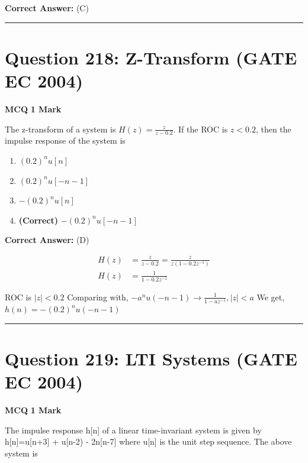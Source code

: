 \documentclass[11pt,a4paper]{article}
\begin{document}
\noindent \textbf{Correct Answer:} (C)


\vspace{1.5em}
\hrule
\vspace{1.5em}

\section*{Question 218: Z-Transform (GATE EC 2004)}
\noindent \textbf{\color{primary}MCQ} \hfill \textbf{\color{secondary}1 Mark}


\noindent The z-transform of a system is $H(z)=\frac{z}{z-0.2}$. 
If the ROC is $z < 0.2$, then the
impulse response of the system is


\begin{enumerate}[label=(\Alph*)]
    \item $(0.2)^{n}u[n]$
    \item $(0.2)^{n}u[-n-1]$
    \item $-(0.2)^{n}u[n]$
    \item \textbf{(Correct)} $-(0.2)^{n}u[-n-1]$
\end{enumerate}

\noindent \textbf{Correct Answer:} (D)

\begin{tcolorbox}[solbox, title=Detailed Solution -- Question 218]
\[
\begin{aligned} H(z)&=\frac{z}{z-0.2}=\frac{z}{z\left(1-0.2 z^{-1}\right)} \\ H(z)&=\frac{1}{1-0.2 z^{-1}} \end{aligned}
\]

 ROC is $|z|< 0.2$
 Comparing with,
$-a^{n} u(-n-1) \rightarrow \frac{1}{1-a z^{-1}},|z|< a$
We get,  $h(n)=-(0.2)^{n} u(-n-1)$
\end{tcolorbox}

\vspace{1.5em}
\hrule
\vspace{1.5em}

\section*{Question 219: LTI Systems (GATE EC 2004)}
\noindent \textbf{\color{primary}MCQ} \hfill \textbf{\color{secondary}1 Mark}


\noindent The impulse response h[n] of a linear time-invariant system is given by 
h[n]=u[n+3] + u[n-2) - 2n[n-7] 
where u[n] is the unit step sequence. The above system is
\end{document}
